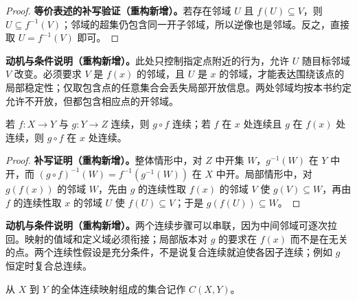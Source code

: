 \documentclass[../../main.tex]{subfiles}%
\begin{document}
\begin{proof}
\textbf{等价表述的补写验证（重构新增）。}若存在邻域 $U$ 且 $f(U)\subseteq V$，则 $U\subseteq f^{-1}(V)$；邻域的超集仍包含同一开子邻域，所以逆像也是邻域。反之，直接取 $U=f^{-1}(V)$ 即可。
\end{proof}
\begin{remark}
\textbf{动机与条件说明（重构新增）。}此处只控制指定点附近的行为，允许 $U$ 随目标邻域 $V$ 改变。必须要求 $V$ 是 $f(x)$ 的邻域，且 $U$ 是 $x$ 的邻域，才能表达围绕该点的局部稳定性；仅取包含点的任意集合会丢失局部开放信息。两处邻域均按本书约定允许不开放，但都包含相应点的开邻域。
\end{remark}
\begin{proposition}\label{proposition:ch04-continuous-composition}
若 $f:X\to Y$ 与 $g:Y\to Z$ 连续，则 $g\circ f$ 连续；若 $f$ 在 $x$ 处连续且 $g$ 在 $f(x)$ 处连续，则 $g\circ f$ 在 $x$ 处连续。
\end{proposition}
\begin{proof}
\textbf{补写证明（重构新增）。}整体情形中，对 $Z$ 中开集 $W$，$g^{-1}(W)$ 在 $Y$ 中开，而 $(g\circ f)^{-1}(W)=f^{-1}(g^{-1}(W))$ 在 $X$ 中开。局部情形中，对 $g(f(x))$ 的邻域 $W$，先由 $g$ 的连续性取 $f(x)$ 的邻域 $V$ 使 $g(V)\subseteq W$，再由 $f$ 的连续性取 $x$ 的邻域 $U$ 使 $f(U)\subseteq V$；于是 $g(f(U))\subseteq W$。
\end{proof}
\begin{remark}
\textbf{动机与条件说明（重构新增）。}两个连续步骤可以串联，因为中间邻域可逐次拉回。映射的值域和定义域必须衔接；局部版本对 $g$ 的要求在 $f(x)$ 而不是在无关的点。两个连续性假设是充分条件，不是说复合连续就迫使各因子连续；例如 $g$ 恒定时复合总连续。
\end{remark}
\begin{definition}[连续映射集的记号]\label{definition:ch04-continuous-maps-set}
从 $X$ 到 $Y$ 的全体连续映射组成的集合记作 $C(X,Y)$。
\end{definition}
\end{document}
